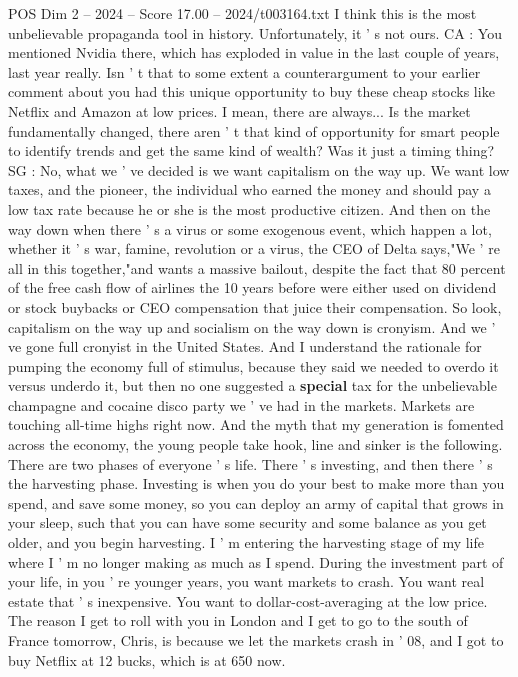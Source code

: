 \begin{textsample}{POS Dim 2 – 2024 – Score 17.00 – 2024/t003164.txt}
I think this is the most unbelievable propaganda tool in history.
Unfortunately, it ' s not ours.
CA : You mentioned Nvidia there, which has exploded in value in the last couple of years, last year really.
Isn ' t that to some extent a counterargument to your earlier comment about you had this unique opportunity to buy these cheap stocks like Netflix and Amazon at low prices.
I mean, there are always...
Is the market fundamentally changed, there aren ' t that kind of opportunity for smart people to identify trends and get the same kind of wealth?
Was it just a timing thing?
SG : No, what we ' ve decided is we want capitalism on the way up.
We want low taxes, and the pioneer, the individual who earned the money and should pay a low tax rate because he or she is the most productive citizen.
And then on the way down when there ' s a virus or some exogenous event, which happen a lot, whether it ' s war, famine, revolution or a virus, the CEO of Delta says,"We ' re all in this together,"and wants a massive bailout, despite the fact that 80 percent of the free cash flow of airlines the 10 years before were either used on dividend or stock buybacks or CEO compensation that juice their compensation.
So look, capitalism on the way up and socialism on the way down is cronyism.
And we ' ve gone full cronyist in the United States.
And I understand the rationale for pumping the economy full of stimulus, because they said we needed to overdo it versus underdo it, but then no one suggested a \textbf{special} tax for the unbelievable champagne and cocaine disco party we ' ve had in the markets.
Markets are touching all-time highs right now.
And the myth that my generation is fomented across the economy, the young people take hook, line and sinker is the following.
There are two phases of everyone ' s life.
There ' s investing, and then there ' s the harvesting phase.
Investing is when you do your best to make more than you spend, and save some money, so you can deploy an army of capital that grows in your sleep, such that you can have some security and some balance as you get older, and you begin harvesting.
I ' m entering the harvesting stage of my life where I ' m no longer making as much as I spend.
During the investment part of your life, in you ' re younger years, you want markets to crash.
You want real estate that ' s inexpensive.
You want to dollar-cost-averaging at the low price.
The reason I get to roll with you in London and I get to go to the south of France tomorrow, Chris, is because we let the markets crash in ' 08, and I got to buy Netflix at 12 bucks, which is at 650 now.

\end{textsample}
